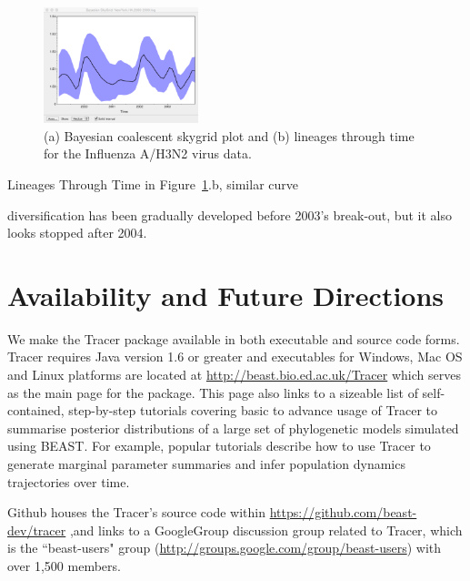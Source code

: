 \documentclass{bioinfo}
\begin{document}
\begin{figure}[ht]
\centerline{
\includegraphics[width=0.4\textwidth]{./figures/fig21.png}
}
\caption{(a) Bayesian coalescent skygrid plot and (b) lineages through time for the Influenza A/H3N2 virus data.}
\label{fig:flu}
\end{figure}

Lineages Through Time in Figure~\ref{fig:flu}.b, similar curve

diversification has been gradually developed before 2003's break-out, but it also looks stopped after 2004.



\section*{Availability and Future Directions}

We make the Tracer package available in both executable and source code forms.  Tracer requires Java version 1.6 or greater and executables for Windows, Mac OS and Linux platforms are located at \url{http://beast.bio.ed.ac.uk/Tracer} %
which serves as the main page for the package. This page also links to a sizeable list of self-contained, step-by-step tutorials covering basic to advance usage of Tracer to summarise posterior distributions of a large set of phylogenetic models simulated using BEAST.  For example, popular tutorials describe how to use Tracer to generate marginal parameter summaries and infer population dynamics trajectories over time.

Github houses the Tracer's source code within \url{https://github.com/beast-dev/tracer} ,and links to a GoogleGroup discussion group related to Tracer,
which is the ``beast-users" group (\url{http://groups.google.com/group/beast-users}) with over 1,500 members.
\end{document}
